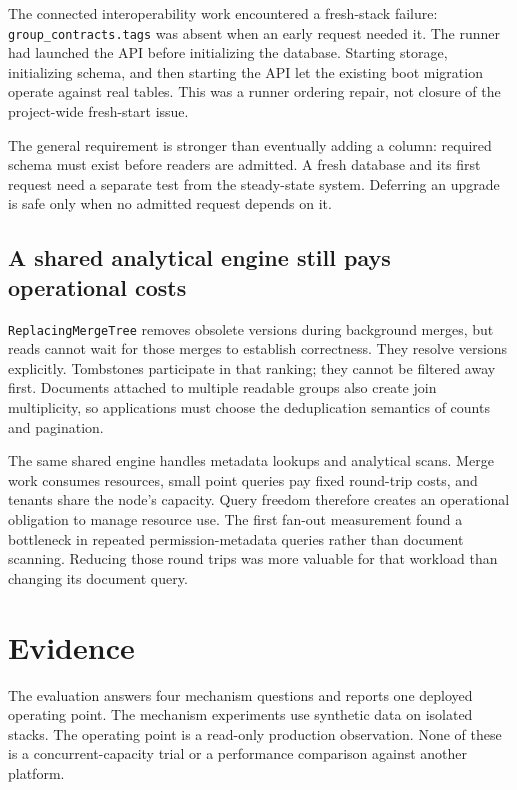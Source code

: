 \documentclass[sigconf, nonacm]{acmart}
\begin{document}
The connected interoperability work encountered a fresh-stack failure:
\texttt{group\_contracts.tags} was absent when an early request needed
it. The runner had launched the API before initializing the database.
Starting storage, initializing schema, and then starting the API let the
existing boot migration operate against real tables. This was a runner
ordering repair, not closure of the project-wide fresh-start issue.

The general requirement is stronger than eventually adding a column:
required schema must exist before readers are admitted. A fresh database
and its first request need a separate test from the steady-state system.
Deferring an upgrade is safe only when no admitted request depends on it.

\subsection{A shared analytical engine still pays operational costs}

\texttt{ReplacingMergeTree} removes obsolete versions during background
merges, but reads cannot wait for those merges to establish correctness.
They resolve versions explicitly. Tombstones participate in that ranking;
they cannot be filtered away first. Documents attached to multiple readable
groups also create join multiplicity, so applications must choose the
deduplication semantics of counts and pagination.

The same shared engine handles metadata lookups and analytical scans.
Merge work consumes resources, small point queries pay fixed round-trip
costs, and tenants share the node's capacity. Query freedom therefore
creates an operational obligation to manage resource use. The first
fan-out measurement found a bottleneck in repeated permission-metadata
queries rather than document scanning. Reducing those round trips was
more valuable for that workload than changing its document query.

\section{Evidence}
\label{sec:evaluation}

The evaluation answers four mechanism questions and reports one deployed
operating point. The mechanism experiments use synthetic data on isolated
stacks. The operating point is a read-only production observation. None
of these is a concurrent-capacity trial or a performance comparison
against another platform.
\end{document}
